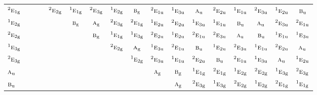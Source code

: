 \documentclass[10pt,a4paper]{article}
\numberwithin{equation}{section}
\newcommand{\irr}[1]{\text{\normalfont\scshape #1}}
\newcommand{\conjpair}[1]{{}^{#1}}
\newcommand{\ptag}[1]{\mathrm{#1}}
\begin{document}
{\begin{longtable}{@{}lcccccccccccccccc@{}}
$\conjpair{2}\irr{e}_{1\ptag{g}}$ &  &  &  & $\conjpair{2}\irr{e}_{2\ptag{g}}$ & $\conjpair{1}\irr{e}_{1\ptag{g}}$ & $\conjpair{2}\irr{e}_{3\ptag{g}}$ & $\conjpair{1}\irr{e}_{2\ptag{g}}$ & $\irr{b}_{\ptag{g}}$ & $\conjpair{2}\irr{e}_{1\ptag{u}}$ & $\conjpair{1}\irr{e}_{3\ptag{u}}$ & $\irr{a}_{\ptag{u}}$ & $\conjpair{2}\irr{e}_{2\ptag{u}}$ & $\conjpair{1}\irr{e}_{1\ptag{u}}$ & $\conjpair{2}\irr{e}_{3\ptag{u}}$ & $\conjpair{1}\irr{e}_{2\ptag{u}}$ & $\irr{b}_{\ptag{u}}$\\
$\conjpair{1}\irr{e}_{2\ptag{g}}$ &  &  &  &  & $\irr{b}_{\ptag{g}}$ & $\irr{a}_{\ptag{g}}$ & $\conjpair{2}\irr{e}_{3\ptag{g}}$ & $\conjpair{2}\irr{e}_{1\ptag{g}}$ & $\conjpair{1}\irr{e}_{2\ptag{u}}$ & $\conjpair{2}\irr{e}_{2\ptag{u}}$ & $\conjpair{1}\irr{e}_{3\ptag{u}}$ & $\conjpair{1}\irr{e}_{1\ptag{u}}$ & $\irr{b}_{\ptag{u}}$ & $\irr{a}_{\ptag{u}}$ & $\conjpair{2}\irr{e}_{3\ptag{u}}$ & $\conjpair{2}\irr{e}_{1\ptag{u}}$\\
$\conjpair{2}\irr{e}_{2\ptag{g}}$ &  &  &  &  &  & $\irr{b}_{\ptag{g}}$ & $\conjpair{1}\irr{e}_{1\ptag{g}}$ & $\conjpair{1}\irr{e}_{3\ptag{g}}$ & $\conjpair{2}\irr{e}_{2\ptag{u}}$ & $\conjpair{1}\irr{e}_{2\ptag{u}}$ & $\conjpair{2}\irr{e}_{1\ptag{u}}$ & $\conjpair{2}\irr{e}_{3\ptag{u}}$ & $\irr{a}_{\ptag{u}}$ & $\irr{b}_{\ptag{u}}$ & $\conjpair{1}\irr{e}_{1\ptag{u}}$ & $\conjpair{1}\irr{e}_{3\ptag{u}}$\\
$\conjpair{1}\irr{e}_{3\ptag{g}}$ &  &  &  &  &  &  & $\conjpair{2}\irr{e}_{2\ptag{g}}$ & $\irr{a}_{\ptag{g}}$ & $\conjpair{1}\irr{e}_{3\ptag{u}}$ & $\conjpair{2}\irr{e}_{1\ptag{u}}$ & $\irr{b}_{\ptag{u}}$ & $\conjpair{1}\irr{e}_{2\ptag{u}}$ & $\conjpair{2}\irr{e}_{3\ptag{u}}$ & $\conjpair{1}\irr{e}_{1\ptag{u}}$ & $\conjpair{2}\irr{e}_{2\ptag{u}}$ & $\irr{a}_{\ptag{u}}$\\
$\conjpair{2}\irr{e}_{3\ptag{g}}$ &  &  &  &  &  &  &  & $\conjpair{1}\irr{e}_{2\ptag{g}}$ & $\conjpair{2}\irr{e}_{3\ptag{u}}$ & $\conjpair{1}\irr{e}_{1\ptag{u}}$ & $\conjpair{2}\irr{e}_{2\ptag{u}}$ & $\irr{b}_{\ptag{u}}$ & $\conjpair{2}\irr{e}_{1\ptag{u}}$ & $\conjpair{1}\irr{e}_{3\ptag{u}}$ & $\irr{a}_{\ptag{u}}$ & $\conjpair{1}\irr{e}_{2\ptag{u}}$\\
$\irr{a}_{\ptag{u}}$ &  &  &  &  &  &  &  &  & $\irr{a}_{\ptag{g}}$ & $\irr{b}_{\ptag{g}}$ & $\conjpair{1}\irr{e}_{1\ptag{g}}$ & $\conjpair{2}\irr{e}_{1\ptag{g}}$ & $\conjpair{1}\irr{e}_{2\ptag{g}}$ & $\conjpair{2}\irr{e}_{2\ptag{g}}$ & $\conjpair{1}\irr{e}_{3\ptag{g}}$ & $\conjpair{2}\irr{e}_{3\ptag{g}}$\\
$\irr{b}_{\ptag{u}}$ &  &  &  &  &  &  &  &  &  & $\irr{a}_{\ptag{g}}$ & $\conjpair{2}\irr{e}_{3\ptag{g}}$ & $\conjpair{1}\irr{e}_{3\ptag{g}}$ & $\conjpair{2}\irr{e}_{2\ptag{g}}$ & $\conjpair{1}\irr{e}_{2\ptag{g}}$ & $\conjpair{2}\irr{e}_{1\ptag{g}}$ & $\conjpair{1}\irr{e}_{1\ptag{g}}$\\

\end{longtable}}
\end{document}
